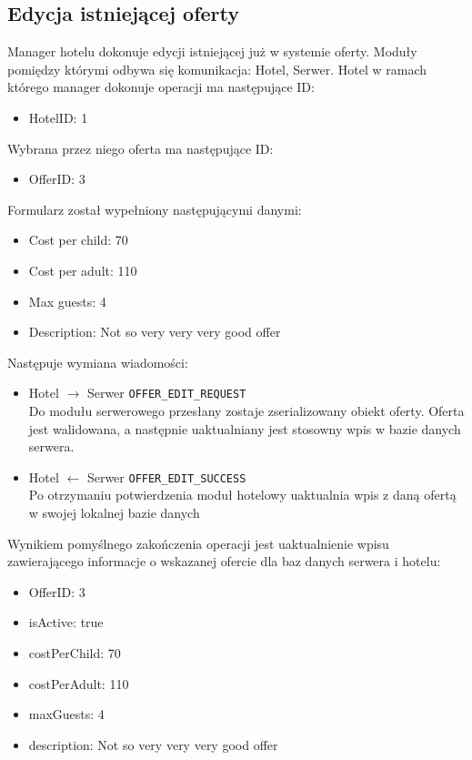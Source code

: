 \documentclass{article}
\begin{document}
\subsection{Edycja istniejącej oferty} 
Manager hotelu dokonuje edycji istniejącej już w systemie oferty. Moduły pomiędzy którymi odbywa się komunikacja: Hotel, Serwer. Hotel w ramach którego manager dokonuje operacji ma następujące ID:
\begin{itemize}
    \item HotelID: 1
\end{itemize}
Wybrana przez niego oferta ma następujące ID:
\begin{itemize}
    \item OfferID: 3
\end{itemize}
Formularz został wypełniony następującymi danymi: 
\begin{itemize}
    \item Cost per child: 70
    \item Cost per adult: 110
    \item Max guests: 4
    \item Description: Not so very very very good offer 
\end{itemize}
Następuje wymiana wiadomości:
\begin{itemize}
    \item Hotel $\rightarrow$ Serwer \texttt{OFFER\_EDIT\_REQUEST}\\ 
    Do modułu serwerowego przesłany zostaje zserializowany obiekt oferty. Oferta jest walidowana, a następnie uaktualniany jest stosowny wpis w bazie danych serwera. 
    \item Hotel $\leftarrow$ Serwer \texttt{OFFER\_EDIT\_SUCCESS}\\
    Po otrzymaniu potwierdzenia moduł hotelowy uaktualnia wpis z daną ofertą w swojej lokalnej bazie danych
\end{itemize}
Wynikiem pomyślnego zakończenia operacji jest uaktualnienie wpisu zawierającego informacje o wskazanej ofercie dla baz danych serwera i hotelu:
\begin{itemize}
    \item OfferID: 3
    \item isActive: true
    \item costPerChild: 70
    \item costPerAdult: 110
    \item maxGuests: 4
    \item description: Not so very very very good offer 
\end{itemize}
\end{document}
